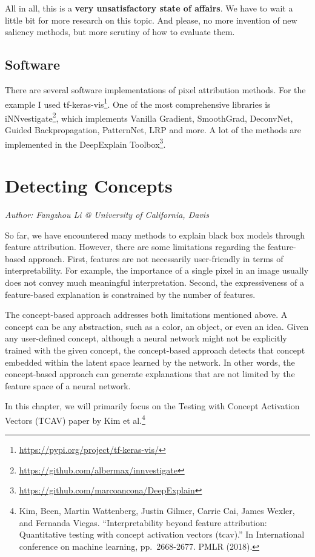 \documentclass[
  11pt,
]{scrbook}
\renewcommand{\href}[2]{#2\footnote{\url{#1}}}
\begin{document}
All in all, this is a \textbf{very unsatisfactory state of affairs}.
We have to wait a little bit for more research on this topic.
And please, no more invention of new saliency methods, but more scrutiny of how to evaluate them.

\hypertarget{software-6}{%
\subsection{Software}\label{software-6}}

There are several software implementations of pixel attribution methods.
For the example I used \href{https://pypi.org/project/tf-keras-vis/}{tf-keras-vis}.
One of the most comprehensive libraries is \href{https://github.com/albermax/innvestigate}{iNNvestigate}, which implements Vanilla Gradient, SmoothGrad, DeconvNet, Guided Backpropagation, PatternNet, LRP and more.
A lot of the methods are implemented in the \href{https://github.com/marcoancona/DeepExplain}{DeepExplain Toolbox}.

\newpage

\hypertarget{detecting-concepts}{%
\section{Detecting Concepts}\label{detecting-concepts}}

\emph{Author: Fangzhou Li @ University of California, Davis}

So far, we have encountered many methods to explain black box models through feature attribution.
However, there are some limitations regarding the feature-based approach.
First, features are not necessarily user-friendly in terms of interpretability.
For example, the importance of a single pixel in an image usually does not convey much meaningful interpretation.
Second, the expressiveness of a feature-based explanation is constrained by the number of features.

The concept-based approach addresses both limitations mentioned above.
A concept can be any abstraction, such as a color, an object, or even an idea.
Given any user-defined concept, although a neural network might not be explicitly trained with the given concept, the concept-based approach detects that concept embedded within the latent space learned by the network.
In other words, the concept-based approach can generate explanations that are not limited by the feature space of a neural network.

In this chapter, we will primarily focus on the Testing with Concept Activation Vectors (TCAV) paper by Kim et al.\footnote{Kim, Been, Martin Wattenberg, Justin Gilmer, Carrie Cai, James Wexler, and Fernanda Viegas. ``Interpretability beyond feature attribution: Quantitative testing with concept activation vectors (tcav).'' In International conference on machine learning, pp.~2668-2677. PMLR (2018).}
\end{document}
